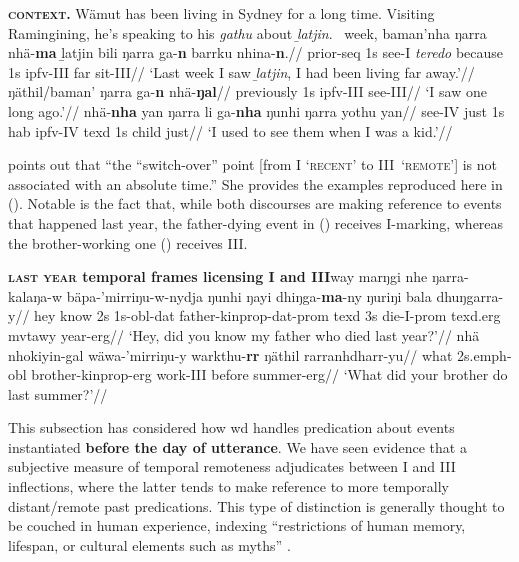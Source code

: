 \pex\textbf{\textsc{context.}} Wämut has been living in Sydney for a long time. Visiting Ramingining, he's speaking to his \textit{gathu} about \textit{ḻatjin}.
\a\begingl\gla {}~week, baman'nha ŋarra nhä-\textbf{ma} ḻatjin bili ŋarra ga-\textbf{n} barrku nhina-\textbf{n}.//
\glb prior-\gls{seq} 1s see-\gls{I} \textsl{teredo} because 1s \gls{ipfv}-\gls{III} far sit-\gls{III}//
\glft`Last week I saw \textit{ḻatjin}, I had been living far away.'//\endgl
\a\begingl\gla ŋäthil/baman' ŋarra ga-\textbf{n} nhä-\textbf{ŋal}//
\glb previously 1s \gls{ipfv}-\gls{III} see-\gls{III}//
\glft`I saw one long ago.'//\endgl
\a\begingl\gla nhä-\textbf{nha} yan ŋarra li ga-\textbf{nha} ŋunhi ŋarra yothu yan//
\glb see-\gls{IV} just 1s \gls{hab} \gls{ipfv}-\gls{IV} \gls{texd} 1s child just//
\glft`I used to see them when I was a kid.'\trailingcitation{[AW~20190422]}//\endgl\xe




 \citet[343]{Wilkinson1991} points out that ``the ``switch-over'' point [from \gls{I} `\textsc{recent}' to \gls{III}~\textsc{`remote'}] is not associated with an absolute time.'' She provides the examples reproduced here in (). Notable is the fact that, while both discourses are making reference to events that happened last year, the father-dying event in () receives \gls{I}-marking, whereas the brother-working one () receives \gls{III}.

\pex{}\textbf{\textsc{last year} temporal frames licensing \gls{I} and \gls{III}}\a\begingl\gla way marŋgi nhe ŋarra-kalaŋa-w bäpa-'mirriŋu-w-nydja ŋunhi ŋayi dhiŋga-\textbf{ma}-ny ŋuriŋi bala dhuŋgarra-y//
\glb hey know 2s 1s-\gls{obl}-\gls{dat} father-\gls{kinprop}-\gls{dat}-\gls{prom} \gls{texd} 3s die-\gls{I}-\gls{prom} \gls{texd}.\gls{erg} \gls{mvtawy} year-\gls{erg}//
\glft`Hey, did you know my father who died last year?'//\endgl
\a\begingl\gla nhä nhokiyin-gal wäwa-'mirriŋu-y warkthu-\textbf{rr} ŋäthil rarranhdharr-yu//
\glb what 2s.\gls{emph}-\gls{obl} brother-\gls{kinprop}-\gls{erg} work-\gls{III} before summer-\gls{erg}//
\glft`What did your brother do last summer?'//\endgl
\xe


This subsection has considered how \gls{wd} handles predication about events instantiated \textbf{before the day of utterance}. We have seen evidence that a subjective measure of temporal remoteness adjudicates between \gls{I} and \gls{III} inflections, where the latter tends to make reference to more temporally distant/remote past predications. This type of distinction is generally thought to be couched in human experience, indexing ``restrictions of human memory, lifespan, or cultural elements such as myths'' \citep[544]{Botne2012}.

